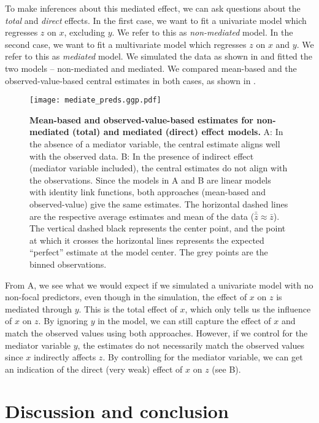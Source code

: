 To make inferences about this mediated effect, we can ask questions about the \emph{total} and \emph{direct} effects. In the first case, we want to fit a univariate model which regresses $z$ on $x$, excluding $y$. We refer to this as \emph{non-mediated} model. In the second case, we want to fit a multivariate model which regresses $z$ on $x$ and $y$. We refer to this as \emph{mediated} model. We simulated the data as shown in  and fitted the two models -- non-mediated and mediated. We compared mean-based and the observed-value-based central estimates in both cases, as shown in .
%
\begin{figure}
\begin{center}
\texttt{[image: mediate\_preds.ggp.pdf]}
\end{center}
\caption{{\bf Mean-based and observed-value-based estimates for non-mediated (total) and mediated (direct) effect models.} A: In the absence of a mediator variable, the central estimate aligns well with the observed data. B: In the presence of indirect effect (mediator variable included), the central estimates do not align with the observations. Since the models in A and B are linear models with identity link functions, both approaches (mean-based and observed-value) give the same estimates. The horizontal dashed lines are the respective average estimates and mean of the data ($\bar{\hat{z}} \approx \bar{z}$). The vertical dashed black represents the center point, and the point at which it crosses the horizontal lines represents the expected ``perfect'' estimate at the model center. The grey points are the binned observations.}
\label{fig:pred_mediated_plots}
\end{figure}
%
From A, we see what we would expect if we simulated a univariate model with no non-focal predictors, even though in the simulation, the effect of $x$ on $z$ is mediated through $y$. This is the total effect of $x$, which only tells us the influence of $x$ on $z$. By ignoring $y$ in the model, we can still capture the effect of $x$ and match the observed values using both approaches. However, if we control for the mediator variable $y$, the estimates do not necessarily match the observed values since $x$ indirectly affects $z$. By controlling for the mediator variable, we can get an indication of the direct (very weak) effect of $x$ on $z$ (see B).


\section{Discussion and conclusion}

